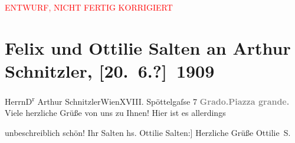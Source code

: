 
\begin{center}
            \textcolor{red}{ENTWURF, NICHT FERTIG KORRIGIERT}
                      \end{center}
            
         \renewcommand{\erwaehnteOrte}{Orte: Edmund-Weiß-Gasse, Grado, Piazza Duca D’Aosta, Wien}
         \renewcommand{\erwaehnteWerke}{}
               \section[Felix und Ottilie Salten an Arthur Schnitzler, {[}20. 6.?{]} 1909]{ Felix und Ottilie Salten an Arthur Schnitzler,
               {[}20. 6.?{]} 1909}\nopagebreak{}\rehead{ }\begin{ledgroupsized}[t]{13cm}\normalsize\beginnumbering \toendnotes[C]{\smallbreak\pagebreak[2]} 
\pstart{}{\pb}Herrn\pend{}\pstart{}D\textsuperscript{r} Arthur Schnitzler\pend{}\pstart{}Wien\pend{}\pstart{}XVIII. Spöttelgaſse 7\pend{}{\bigskip}\pstart
           \noindent{}\centering{}{\pb}\textcolor{gray}{\textbf{Grado.\hspace*{5em}Piazza grande.}}\pend
           \pstart
           Viele herzliche Grüße von uns zu Ihnen! Hier ist es allerdings
          
               unbeschreiblich schön!\pend
           \pstart Ihr \spacefill\mbox{Salten}\pend{}{\bigskip}\pstart
           \noindent{}{[}hs. Ottilie Salten:{]} Herzliche Grüße\pend
           \pstart \spacefill\mbox{Ottilie S.}\pend{}
         
         \endnumbering{}\end{ledgroupsized}\begin{anhang}\end{anhang}\newcommand{\dateiname}{L03499}\newcommand{\titel}{Felix und Ottilie Salten an Arthur Schnitzler, [20. 6.?] 1909}\newcommand{\editorInnen}{Martin Anton Müller und Laura Untner}
      